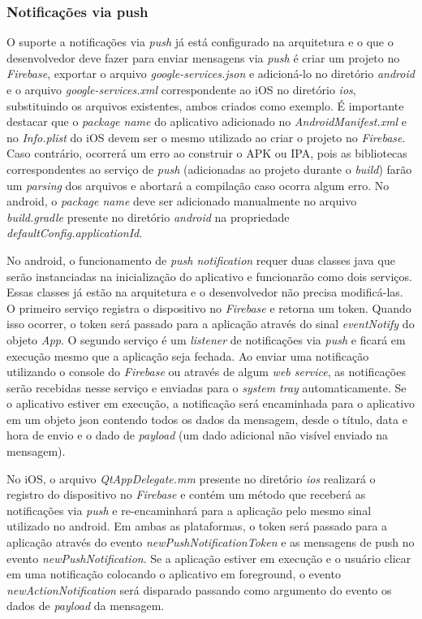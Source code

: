 \subsubsection{Notificações via push}
O suporte a notificações via \textit{push} já está configurado na arquitetura e o que o desenvolvedor deve fazer para enviar mensagens via \textit{push} é criar um projeto no \textit{Firebase}, exportar o arquivo \textit{google-services.json} e adicioná-lo no diretório \textit{android} e o arquivo \textit{google-services.xml} correspondente ao iOS no diretório \textit{ios}, substituindo os arquivos existentes, ambos criados como exemplo. É importante destacar que o \textit{package name} do aplicativo adicionado no \textit{AndroidManifest.xml} e no \textit{Info.plist} do iOS devem ser o mesmo utilizado ao criar o projeto no \textit{Firebase}. Caso contrário, ocorrerá um erro ao construir o APK ou IPA, pois as bibliotecas correspondentes ao serviço de \textit{push} (adicionadas ao projeto durante o \textit{build}) farão um \textit{parsing} dos arquivos e abortará a compilação caso ocorra algum erro. No android, o \textit{package name} deve ser adicionado manualmente no arquivo \textit{build.gradle} presente no diretório \textit{android} na propriedade \textit{defaultConfig.applicationId}.\par

No android, o funcionamento de \textit{push notification} requer duas classes java que serão instanciadas na inicialização do aplicativo e funcionarão como dois serviços. Essas classes já estão na arquitetura e o desenvolvedor não precisa modificá-las. O primeiro serviço registra o dispositivo no \textit{Firebase} e retorna um token. Quando isso ocorrer, o token será passado para a aplicação através do sinal \textit{eventNotify} do objeto \textit{App}. O segundo serviço é um \textit{listener} de notificações via \textit{push} e ficará em execução mesmo que a aplicação seja fechada. Ao enviar uma notificação utilizando o console do \textit{Firebase} ou através de algum \textit{web service}, as notificações serão recebidas nesse serviço e enviadas para o \textit{system tray} automaticamente. Se o aplicativo estiver em execução, a notificação será encaminhada para o aplicativo em um objeto json contendo todos os dados da mensagem, desde o título, data e hora de envio e o dado de \textit{payload} (um dado adicional não visível enviado na mensagem).\par

No iOS, o arquivo \textit{QtAppDelegate.mm} presente no diretório \textit{ios} realizará o registro do dispositivo no \textit{Firebase} e contém um método que receberá as notificações via \textit{push} e re-encaminhará para a aplicação pelo mesmo sinal utilizado no android. Em ambas as plataformas, o token será passado para a aplicação através do evento \textit{newPushNotificationToken} e as mensagens de push no evento \textit{newPushNotification}. Se a aplicação estiver em execução e o usuário clicar em uma notificação colocando o aplicativo em foreground, o evento \textit{newActionNotification} será disparado passando como argumento do evento os dados de \textit{payload} da mensagem.\par

